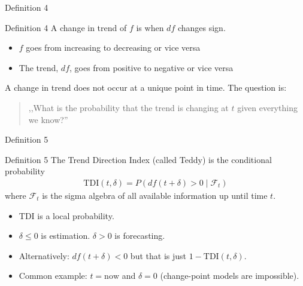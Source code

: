 \documentclass[ignorenonframetext,xcolor=pdflatex,table,dvipsnames,serif]{beamer}
\begin{document}
\begin{frame}{Definition 4}
\begin{alertblock}{Definition 4}
  A \alert{change in trend} of $f$ is when $df$ changes sign.
  \begin{itemize}
    \item{$f$ goes from increasing to decreasing or vice versa}
	\item{The trend, $df$, goes from positive to negative or vice versa}
  \end{itemize}
  
  \pause
 
  \vspace{1cm}
  
  A change in trend does not occur at a unique point in time. The question is:
  \begin{quotation}
	  ,,What is the \alert{probability} that the trend is changing at $t$ given everything we know?''
  \end{quotation}
\end{alertblock}    
\end{frame}


\begin{frame}{Definition 5}
\begin{alertblock}{Definition 5}
  The \alert{Trend Direction Index} (called Teddy) is the conditional probability
  \begin{align*}
    \mathrm{TDI}(t, \delta) = P(df(t + \delta) > 0 \mid \mathcal{F}_t)
  \end{align*}
  where $\mathcal{F}_t$ is the sigma algebra of all available information up until time $t$.
\end{alertblock}    

\pause

\vspace{0.5cm}
\begin{itemize}
	\item{TDI is a local probability.}
	\item{$\delta \leq 0$ is estimation. $\delta > 0$ is forecasting.}
	\item{Alternatively: $df(t + \delta) < 0$ but that is just $1 - \mathrm{TDI}(t, \delta)$.}
	\item{Common example: $t = \mathrm{now}$ and $\delta = 0$ (change-point models are impossible).}
\end{itemize}
\end{frame}
\end{document}
